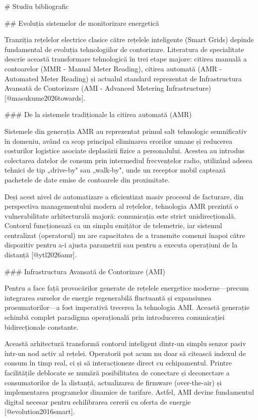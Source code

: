 # Studiu bibliografic

## Evoluția sistemelor de monitorizare energetică

Tranziția rețelelor electrice clasice către rețelele inteligente (Smart
Grids) depinde fundamental de evoluția tehnologiilor de contorizare.
Literatura de specialitate descrie această transformare tehnologică în
trei etape majore: citirea manuală a contoarelor (MMR - Manual Meter
Reading), citirea automată (AMR - Automated Meter Reading) și actualul
standard reprezentat de Infrastructura Avansată de Contorizare (AMI -
Advanced Metering Infrastructure) [@masukume2026towards].

### De la sistemele tradiționale la citirea automată (AMR)

Sistemele din generația AMR au reprezentat primul salt tehnologic
semnificativ în domeniu, având ca scop principal eliminarea erorilor
umane și reducerea costurilor logistice asociate deplasării fizice a
personalului. Acestea au introdus colectarea datelor de consum prin
intermediul frecvențelor radio, utilizând adesea tehnici de tip
„drive-by" sau „walk-by", unde un receptor mobil captează pachetele de
date emise de contoarele din proximitate.

Deși acest nivel de automatizare a eficientizat masiv procesul de
facturare, din perspectiva managementului modern al rețelelor,
tehnologia AMR prezintă o vulnerabilitate arhitecturală majoră:
comunicația este strict unidirecțională. Contorul funcționează ca un
simplu emițător de telemetrie, iar sistemul centralizat (operatorul) nu
are capacitatea de a transmite comenzi înapoi către dispozitiv pentru
a-i ajusta parametrii sau pentru a executa operațiuni de la distanță
[@ytl2026amr].

### Infrastructura Avansată de Contorizare (AMI)

Pentru a face față provocărilor generate de rețelele energetice
moderne---precum integrarea surselor de energie regenerabilă fluctuantă
și expansiunea prosumatorilor---a fost imperativă trecerea la tehnologia
AMI. Această generație schimbă complet paradigma operațională prin
introducerea comunicației bidirecționale constante.

Această arhitectură transformă contorul inteligent dintr-un simplu
senzor pasiv într-un nod activ al rețelei. Operatorii pot acum nu doar
să citească indexul de consum în timp real, ci și să interacționeze
direct cu echipamentul. Printre facilitățile deblocate se numără
posibilitatea de conectare și deconectare a consumatorilor de la
distanță, actualizarea de firmware (over-the-air) și implementarea
programelor dinamice de tarifare. Astfel, AMI devine fundamentul digital
necesar pentru echilibrarea cererii cu oferta de energie
[@evolution2016smart].

